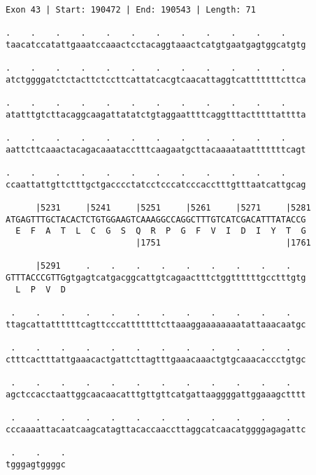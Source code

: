 \documentclass{article}
\begin{document}
\newpage
\begin{Verbatim}
Exon 43 | Start: 190472 | End: 190543 | Length: 71
 
.    .    .    .    .    .    .    .    .    .    .    .    
taacatccatattgaaatccaaactcctacaggtaaactcatgtgaatgagtggcatgtg
  
.    .    .    .    .    .    .    .    .    .    .    .    
atctggggatctctacttctccttcattatcacgtcaacattaggtcatttttttcttca
  
.    .    .    .    .    .    .    .    .    .    .    .    
atatttgtcttacaggcaagattatatctgtaggaattttcaggtttactttttatttta
  
.    .    .    .    .    .    .    .    .    .    .    .    
aattcttcaaactacagacaaatacctttcaagaatgcttacaaaataatttttttcagt
  
.    .    .    .    .    .    .    .    .    .    .    .    
ccaattattgttctttgctgacccctatcctcccatcccacctttgtttaatcattgcag
  
      |5231     |5241     |5251     |5261     |5271     |5281
ATGAGTTTGCTACACTCTGTGGAAGTCAAAGGCCAGGCTTTGTCATCGACATTTATACCG
  E  F  A  T  L  C  G  S  Q  R  P  G  F  V  I  D  I  Y  T  G
                          |1751                         |1761
  
      |5291     .    .    .    .    .    .    .    .    .   
GTTTACCCGTTGgtgagtcatgacggcattgtcagaactttctggttttttgcctttgtg
  L  P  V  D                                                
  
 .    .    .    .    .    .    .    .    .    .    .    .   
ttagcattattttttcagttcccatttttttcttaaaggaaaaaaaatattaaacaatgc
  
 .    .    .    .    .    .    .    .    .    .    .    .   
ctttcactttattgaaacactgattcttagtttgaaacaaactgtgcaaacaccctgtgc
  
 .    .    .    .    .    .    .    .    .    .    .    .   
agctccacctaattggcaacaacatttgttgttcatgattaaggggattggaaagctttt
  
 .    .    .    .    .    .    .    .    .    .    .    .   
cccaaaattacaatcaagcatagttacaccaaccttaggcatcaacatggggagagattc
  
 .    .    .
tgggagtggggc
\end{Verbatim}
\newpage
\end{document}
